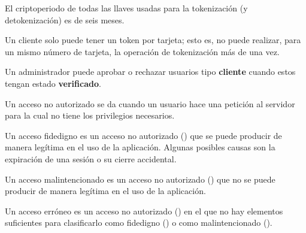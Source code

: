{
  El criptoperiodo de todas las llaves usadas para la tokenización (y
  detokenización) es de seis meses.
}

{
  Un cliente solo puede tener un token por tarjeta; esto es, no puede realizar,
  para un mismo número de tarjeta, la operación de tokenización más de una vez.
}

{
  Un administrador puede aprobar o rechazar usuarios tipo \textbf{cliente}
cuando estos tengan estado \textbf{verificado}.
}

{
  Un acceso no autorizado se da cuando un usuario hace una petición al servidor
  para la cual no tiene los privilegios necesarios.
}

{
  Un acceso fidedigno es un acceso no autorizado
  () que se puede producir de manera
  legítima en el uso de la aplicación. Algunas posibles causas son la expiración
  de una sesión o su cierre accidental.
}


{
  Un acceso malintencionado es un acceso no autorizado
  () que no se puede producir de manera
  legítima en el uso de la aplicación.
}

{
  Un acceso erróneo es un acceso no autorizado
  () en el que no hay elementos
  suficientes para clasificarlo como fidedigno
  () o como malintencionado
  ().
}
